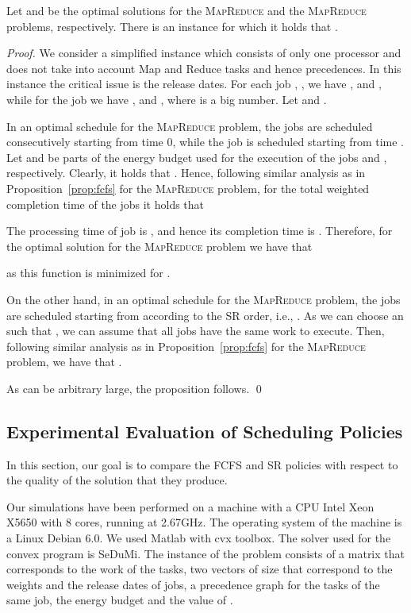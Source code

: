 \documentclass{llncs}
\newcommand{\mr}{\textsc{MapReduce}\xspace}
\newcommand{\fcfs}{\textsc{FCFS}\xspace}
\newcommand{\mrf}{\textsc{MapReduce}\xspace}
\newcommand{\mrsr}{\textsc{MapReduce}\xspace}
\newcommand{\sr}{\textsc{SR}\xspace}
\begin{document}
\begin{proposition}\label{prop:sr}
Let  and  be the optimal solutions for the \mr and the \mrsr problems, respectively.
There is an instance for which it holds that .
\end{proposition}
\begin{proof}
We consider a simplified instance which consists of only one processor and does not take into account Map and Reduce tasks and hence precedences.
In this instance the critical issue is the release dates.
For each job , , we have ,  and ,
while for the job  we have ,  and , where  is a big number.
Let  and .

In an optimal schedule for the \mr problem, the jobs  are scheduled consecutively starting from time 0,
while the job  is scheduled starting from time .
Let  and  be parts of the energy budget used for the execution of the jobs  and , respectively.
Clearly, it holds that .
Hence, following similar analysis as in Proposition~\ref{prop:fcfs} for the \mrf problem,
for the total weighted completion time of the jobs  it holds that

The processing time of job  is , and hence its completion time is .
Therefore, for the optimal solution for the \mr problem we have that

as this function is minimized for .

On the other hand, in an optimal schedule for the \mrsr problem,
the jobs are scheduled starting from  according to the \sr order, i.e., .
As we can choose an  such that , we can assume that all jobs have the same work to execute.
Then, following similar analysis as in Proposition~\ref{prop:fcfs} for the \mrf problem,
we have that .

As  can be arbitrary large, the proposition follows. \qed
\end{proof}

\subsection{Experimental Evaluation of Scheduling Policies}

In this section, our goal is to compare the \fcfs and \sr policies with respect to the quality of the solution that they produce.


Our simulations have been performed on a machine with a CPU Intel Xeon X5650 with 8 cores, running at 2.67GHz.
The operating system of the machine is a Linux Debian 6.0.
We used Matlab with cvx toolbox.
The solver used for the convex program is SeDuMi.
The instance of the problem consists of a matrix  that corresponds to the work of the tasks,
two vectors of size  that correspond to the weights and the release dates of jobs,
a precedence graph for the tasks of the same job,
the energy budget and the value of .
\end{document}
